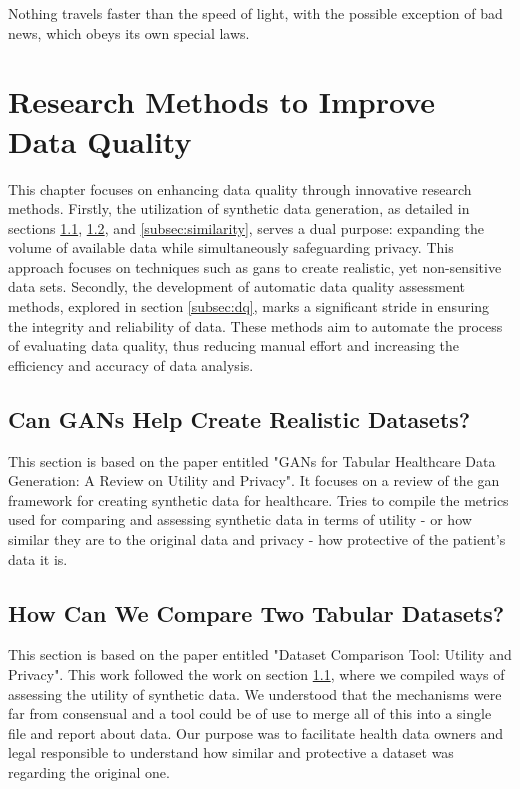 \begin{savequote}[85mm]
    Nothing travels faster than the speed of light, 
    with the possible exception of bad news, which obeys its own special laws.
    \end{savequote}


\chapter{Research Methods to Improve Data Quality}\label{chap:goal1}
This chapter focuses on enhancing data quality through innovative research methods. Firstly, the utilization of synthetic data generation, as detailed in sections \ref{subsec:gans}, \ref{subsec:tabular}, and \ref{subsec:similarity}, serves a dual purpose: expanding the volume of available data while simultaneously safeguarding privacy. This approach focuses on  techniques such as \acp{gan} to create realistic, yet non-sensitive data sets. Secondly, the development of automatic data quality assessment methods, explored in section \ref{subsec:dq}, marks a significant stride in ensuring the integrity and reliability of data. These methods aim to automate the process of evaluating data quality, thus reducing manual effort and increasing the efficiency and accuracy of data analysis.



\section{Can GANs Help Create Realistic Datasets?}\label{subsec:gans}
This section is based on the paper entitled "GANs for Tabular Healthcare Data Generation: A Review on Utility and Privacy". It focuses on a review of the \ac{gan} framework for creating synthetic data for healthcare. Tries to compile the metrics used for comparing and assessing synthetic data in terms of utility - or how similar they are to the original data and privacy - how protective of the patient's data it is. 



\section{How Can We Compare Two Tabular Datasets?}\label{subsec:tabular}
This section is based on the paper entitled "Dataset Comparison Tool: Utility and Privacy". This work followed the work on section \ref{subsec:gans}, where we compiled ways of assessing the utility of synthetic data. We understood that the mechanisms were far from consensual and a tool could be of use to merge all of this into a single file and report about data. Our purpose was to facilitate health data owners and legal responsible to understand how similar and protective a dataset was regarding the original one.

